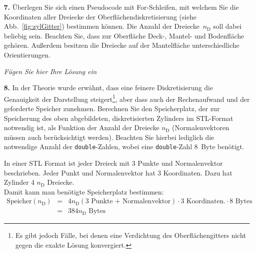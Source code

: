 \documentclass[Protokollheft.tex]{subfiles}
\begin{document}
    \begin{framed}
	\noindent \textbf{7.} Überlegen Sie sich einen Pseudocode mit For-Schleifen, mit welchem Sie die Koordinaten aller Dreiecke der Oberflächendiskretisierung (siehe Abb.~\ref{fig:zylGitter}) bestimmen können. Die Anzahl der Dreiecke~$n_\text{D}$ soll dabei beliebig sein. Beachten Sie, dass zur Oberfläche Deck-, Mantel- und Bodenfläche gehören. Außerdem besitzen die Dreiecke auf der Mantelfläche \glqq unterschiedliche Orientierungen\grqq.\label{exer:pseudocodeCylinder}
\end{framed}

\emph{Fügen Sie hier Ihre Lösung ein}

    \begin{framed}
	\noindent \textbf{8.} In der Theorie wurde erwähnt, dass eine feinere Diskretisierung die Genauigkeit der Darstellung steigert\footnote{Es gibt jedoch Fälle, bei denen eine Verdichtung des Oberflächengitters nicht gegen die exakte Lösung konvergiert.}, aber dass auch der Rechenaufwand und der geforderte Speicher zunehmen.
        Berechnen Sie den Speicherplatz, der zur Speicherung des oben abgebildeten, diskretisierten Zylinders im STL-Format notwendig ist, als Funktion der Anzahl der Dreiecke $n_\mathrm{D}$ (Normalenvektoren müssen auch berücksichtigt werden). Beachten Sie hierbei lediglich die notwendige Anzahl der \lstinline{double}-Zahlen, wobei eine \lstinline{double}-Zahl \SI{8}{Byte} benötigt.\label{exer:requiredStorage}
\end{framed}

In einer STL Format ist jeder Dreieck mit 3 Punkte und Normalenvektor beschrieben. Jeder Punkt und Normalenvektor hat 3 Koordinaten. Dazu hat Zylinder 4 $n_\text{D}$ Dreiecke.\\
Damit kann man benötigte Speicherplatz bestimmen:
 	\begin{eqnarray*}
 		\text{Speicher}(n_\mathrm{D})&=&4n_\mathrm{D}(3\text{ Punkte + Normalenvektor})\cdot 3 \text{ Koordinaten.}\cdot 8\text{ Bytes}\\
 		&=&384n_\mathrm{D} \text{ Bytes}
 	\end{eqnarray*}
\end{document}
